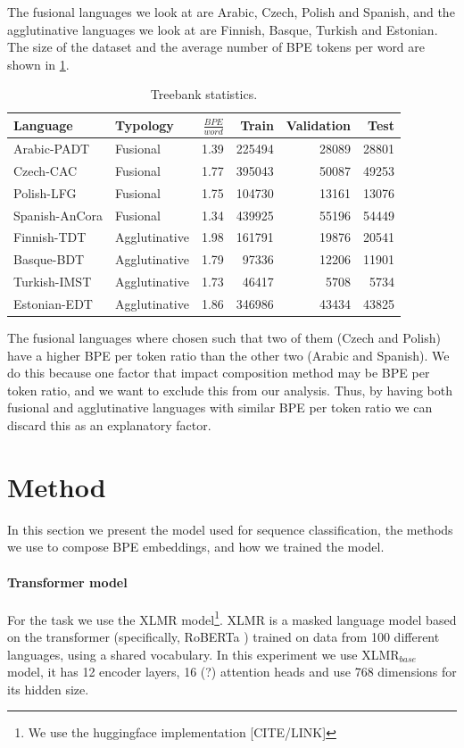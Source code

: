 \documentclass[11pt]{article}
\begin{document}
   	The fusional languages we look at are Arabic, Czech, Polish and Spanish, and the agglutinative languages we look at are Finnish, Basque, Turkish and Estonian. The size of the dataset and the average number of BPE tokens per word are shown in \cref{tab:data}.
    
    	\begin{table}[h]
		\centering
		\begin{tabular}{l|lrrrr}
			Language & Typology & $\frac{BPE}{word}$ & Train & Validation & Test \\
			\hline
			Arabic-PADT  & Fusional & 1.39 & 225494 & 28089 & 28801  \\
			Czech-CAC   & Fusional & 1.77 & 395043 & 50087 & 49253 \\
			Polish-LFG & Fusional & 1.75 & 104730 & 13161 & 13076 \\
			Spanish-AnCora & Fusional & 1.34 & 439925 & 55196 & 54449 \\
			Finnish-TDT & Agglutinative & 1.98 & 161791 & 19876 & 20541 \\
			Basque-BDT  & Agglutinative & 1.79 & 97336 & 12206 & 11901 \\
			Turkish-IMST & Agglutinative & 1.73 & 46417 & 5708 & 5734 \\
			Estonian-EDT & Agglutinative & 1.86 & 346986 & 43434 & 43825 \\
		\end{tabular}
		\caption{\label{tab:data} Treebank statistics.}
	\end{table}
    
    The fusional languages where chosen such that two of them (Czech and Polish) have a higher BPE per token ratio than the other two (Arabic and Spanish). We do this because one factor that impact composition method may be BPE per token ratio, and we want to exclude this from our analysis. Thus, by having both fusional and agglutinative languages with similar BPE per token ratio we can discard this as an explanatory factor. 
    

	
	\section{Method}
	\label{method}
	
	In this section we present the model used for sequence classification, the methods we use to compose BPE embeddings, and how we trained the model.
	
	
	\paragraph{Transformer model}
	For the task we use the XLMR \citep{conneau2019unsupervised} model\footnote{We use the huggingface implementation [CITE/LINK]}. XLMR is a masked language model based on the transformer (specifically, RoBERTa \citep{liu2019roberta}) trained on data from 100 different languages, using a shared vocabulary. In this experiment we use \textsc{XLMR}$_{base}$ model, it has 12 encoder layers, 16 (?) attention heads and use 768 dimensions for its hidden size. 
	
\end{document}
